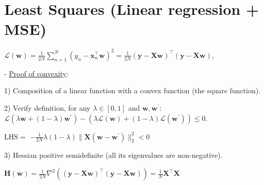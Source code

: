 
\section{Least Squares (Linear regression + MSE)}


$\mathcal{L}(\mathbf{w})=\frac{1}{2 N} \sum_{n=1}^{N}(y_{n}-\mathbf{x}_{n}^{\top} \mathbf{w})^{2}=\frac{1}{2 N}(\mathbf{y}-\mathbf{X} \mathbf{w})^{\top}(\mathbf{y}-\mathbf{X} \mathbf{w})$,



- \underline{Proof of convexity}:

1) Composition of a linear function with a convex function (the square function).

2) Verify definition, for any $\lambda \in[0,1]$ and $\mathbf{w}, \mathbf{w}^{\prime}$:
$\mathcal{L}(\lambda \mathbf{w}+(1-\lambda) \mathbf{w}^{\prime})-(\lambda \mathcal{L}(\mathbf{w})+(1-\lambda) \mathcal{L}(\mathbf{w}^{\prime})) \leq 0$.

$\mathrm{LHS}=$
$-\frac{1}{2 N} \lambda(1-\lambda)\|\mathbf{X}(\mathbf{w}-\mathbf{w}^{\prime})\|_{2}^{2} < 0$


3) Hessian positive semidefinite (all its eigenvalues are non-negative). 

$
\mathbf{H}(\mathbf{w}) =\frac{1}{2N}\nabla^2((\mathbf{y}-\mathbf{X}\mathbf{w})^\top(\mathbf{y}-\mathbf{X}\mathbf{w})) 
=\frac1N\mathbf{X}^\top\mathbf{X}
$

